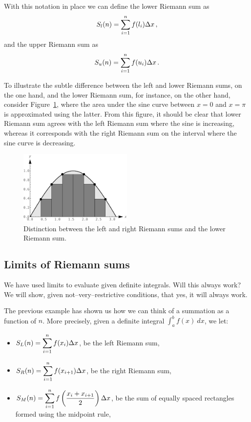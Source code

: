 With this notation in place we can define the lower Riemann sum as
$$\displaystyle S_l(n) = \sum_{i=1}^n f(l_i)\Delta x\,,$$
and the upper Riemann sum as
$$\displaystyle S_u(n) = \sum_{i=1}^n f(u_i)\Delta x\,.$$

To illustrate the subtle difference between the left and lower Riemann sums, on the one hand, and the lower Riemann sum, for instance, on the other hand, consider Figure~\ref{fig_int_7}, where the area under the sine curve between $x=0$ and $x=\pi$ is approximated using the latter. From this figure, it should be clear that lower Riemann sum agrees with the left Riemann sum where the sine is increasing, whereas it corresponds with the right Riemann sum on the interval where the sine curve is decreasing. 

\begin{figure}[h]
	\begin{center}
			\includegraphics[width=0.5\textwidth]{fig_int_7}
	\caption{Distinction between the left and right Riemann sums and the lower Riemann sum.}
	\label{fig_int_7}
	\end{center}
\end{figure}
\fi

\subsection{Limits of Riemann sums}
We have used limits to evaluate given definite integrals. Will this always work? We will show, given not--very--restrictive conditions, that yes, it will always work.

The previous example has shown us how we can think of a summation as a function of $n$. More precisely, given a definite integral $\int_a^b f(x)\ dx$, we let:
	\begin{itemize}
	\item	$\displaystyle S_L(n) = \sum_{i=1}^n f(x_i)\Delta x$, be the left Riemann sum,
	\item	$\displaystyle S_R(n) = \sum_{i=1}^n f(x_{i+1})\Delta x$, be the right Riemann sum,
	\item	$\displaystyle S_M(n) = \sum_{i=1}^n f\left(\frac{x_i+x_{i+1}}{2}\right)\Delta x$, be the sum of equally spaced rectangles formed using the midpoint rule,
	\end{itemize}
	
